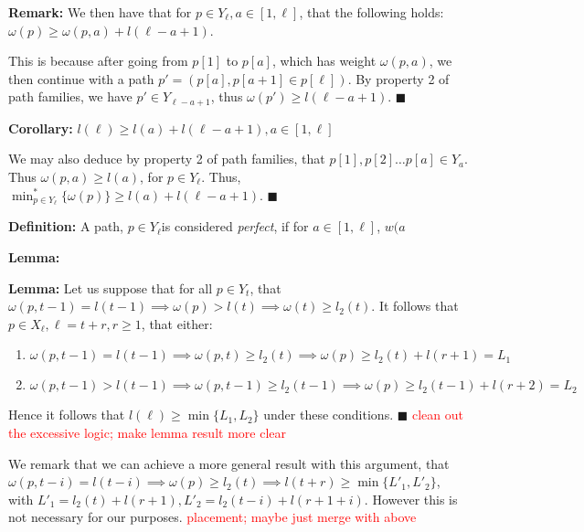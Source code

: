\documentclass{article}
\theoremstyle{definition}
\newcommand{\edit}[1]{\textcolor{red}{#1}}
\begin{document}
{\textbf{Remark:} We then have that for $p \in Y_\ell, a \in [1,\ell]$, that the following holds: $\omega(p) \geq \omega(p,a)+l(\ell-a+1)$.

This is because after going from $p[1]$ to $p[a]$, which has weight $\omega(p,a)$, we then continue with a path $p' = (p[a], p[a+1] \in p[\ell])$. By property 2 of path families, we have  $p' \in Y_{\ell-a+1}$, thus $\omega(p') \geq l(\ell-a+1)$. $\blacksquare$

\textbf{Corollary:} $l(\ell) \geq l(a) + l(\ell-a+1), a \in [1,\ell]$

We may also deduce by property 2 of path families, that $p[1], p[2] \dots p[a] \in Y_a$. Thus $\omega(p,a) \geq l(a)$, for $p \in Y_\ell$. Thus, $\min^*_{p\in Y_\ell}\{\omega(p)\} \geq l(a) +l(\ell-a+1)$. $\blacksquare$

\vspace{1.75em}

\textbf{Definition:} A path, $p \in Y_\ell$is considered \textit{perfect}, if for $a \in [1,\ell]$, $w(a$

\textbf{Lemma:}

\vspace{1.75em}

\textbf{Lemma:} Let us suppose that for all $p \in Y_t$, that $\omega(p,t-1) = l(t-1) \implies \omega(p) > l(t) \implies \omega(t) \geq l_2(t)$. It follows that $p \in X_\ell, \ell = t+r, r \geq 1$, that either:

\begin{enumerate}
    \item $\omega(p,t-1) = l(t-1) \implies \omega(p,t) \geq l_2(t) \implies \omega(p) \geq l_2(t) + l(r+1) = L_1$
    \item $\omega(p,t-1) > l(t-1) \implies \omega(p,t-1) \geq l_2(t-1) \implies \omega(p) \geq l_2(t-1)+ l(r+2) = L_2$
\end{enumerate}

Hence it follows that $l(\ell) \geq \min\{L_1,L_2\}$ under these conditions. $\blacksquare$\edit{ clean out the excessive logic; make lemma result more clear}

We remark that we can achieve a more general result with this argument, that $\omega(p,t-i) = l(t-i) \implies \omega(p) \geq l_2(t) \implies l(t+r) \geq \min \{ L'_1, L'_2\}$, with $L'_1 = l_2(t) + l(r+1), L'_2 = l_2(t-i)+l(r+1+i)$. However this is not necessary for our purposes.\edit{ placement; maybe just merge with above}

\vspace{1.75em}

}
\end{document}
